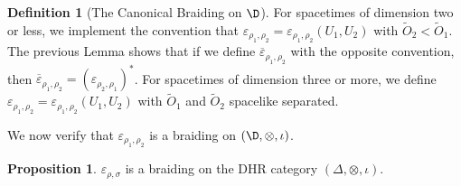 \documentclass[12pt]{article}
\newenvironment{bxd}%
  {\bigskip\noindent\begin{Sbox}\begin{minipage}{0.9\textwidth} }%
  {\end{minipage}\end{Sbox}\fbox{\TheSbox}\bigskip}%
\theoremstyle{definition}
\newtheorem{prop}[thm]{Proposition}
\theoremstyle{definition}
\newtheorem{defn}[thm]{Definition}
\theoremstyle{remark}
\newcommand{\ve}{\varepsilon}
\def\wt#1{{\tilde #1}}
\def\ol#1{{\overline #1}}
\begin{document}
\begin{bxd}
  \begin{defn}[The Canonical Braiding on $\D$] For spacetimes of dimension two or
    less, we implement the convention that $\ve _{\rho _1,\rho _2}=\ve _{\rho _1,\rho
      _2}(U_1,U_2)$ with $\wt O_2<\wt O_1$.  The previous Lemma shows that if we
    define $\ol\ve _{\rho _1,\rho _2}$ with the opposite convention, then $\ol\ve
    _{\rho _1,\rho _2}=(\ve _{\rho _2,\rho _1})^*$.  For spacetimes of dimension
    three or more, we define $\ve _{\rho _1,\rho _2}=\ve _{\rho _1,\rho _2}(U_1,U_2)$
    with $\wt O_1$ and $\wt O_2$ spacelike separated.
\end{defn} \end{bxd}

We now verify that $\ve _{\rho _1,\rho _2}$ is a braiding on $(\D ,\otimes ,\iota )$.

\begin{prop} $\ve _{\rho ,\sigma}$ is a braiding on the DHR category $(\Delta
  ,\otimes ,\iota )$.
\end{prop}
\end{document}

